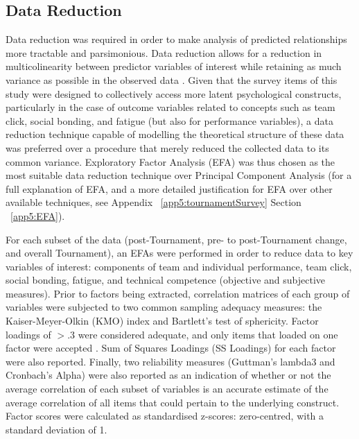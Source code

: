 \clearpage


\begin{landscape}






\end{landscape}
\restoregeometry

\bigskip




\subsection{\label{Ch5:dataReduction}Data Reduction}
Data reduction was required in order to make analysis of predicted relationships more tractable and parsimonious. Data reduction allows for a reduction in multicolinearity between predictor variables of interest while retaining as much variance as possible in the observed data \citep{Yong2013}.  Given that the survey items of this study were designed to collectively access more latent psychological constructs, particularly in the case of outcome variables related to concepts such as team click, social bonding, and fatigue (but also for performance variables), a data reduction technique capable of modelling the theoretical structure of these data was preferred over a procedure that merely reduced the collected data to its common variance.  Exploratory Factor Analysis (EFA) was thus chosen as the most suitable data reduction technique over Principal Component Analysis (for a full explanation of EFA, and a more detailed justification for EFA over other available techniques, see Appendix ~\ref{app5:tournamentSurvey} Section ~\ref{app5:EFA}).

For each subset of the data (post-Tournament, pre- to post-Tournament change, and overall Tournament), an EFAs were performed in order to reduce data to key variables of interest: components of team and individual performance, team click, social bonding, fatigue, and technical competence (objective and subjective measures). Prior to factors being extracted, correlation matrices of each group of variables were subjected to two common sampling adequacy measures: the Kaiser-Meyer-Olkin (KMO) index and Bartlett’s test of sphericity.  Factor loadings of $> .3$ were considered adequate, and only items that loaded on one factor were accepted \citep{Field2012}. Sum of Squares Loadings (SS Loadings) for each factor were also reported\citep{Dziuban1974}.  Finally, two reliability measures (Guttman's lambda3 and Cronbach's Alpha) were also reported as an indication of whether or not the average correlation of each subset of variables is an accurate estimate of the average correlation of all items that could pertain to the underlying construct.  Factor scores were calculated as standardised z-scores: zero-centred, with a standard deviation of 1.



